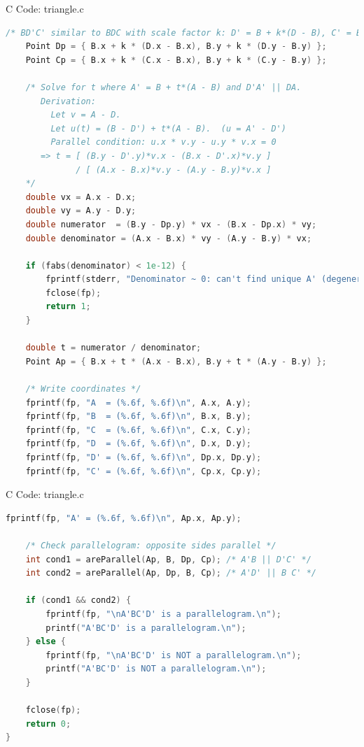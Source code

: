\documentclass{beamer}
\numberwithin{equation}{section}
\theoremstyle{remark}
\begin{document}
\begin{frame}[fragile]{C Code: triangle.c}
\begin{lstlisting}[language=C]
    /* BD'C' similar to BDC with scale factor k: D' = B + k*(D - B), C' = B + k*(C - B) */
    Point Dp = { B.x + k * (D.x - B.x), B.y + k * (D.y - B.y) };
    Point Cp = { B.x + k * (C.x - B.x), B.y + k * (C.y - B.y) };

    /* Solve for t where A' = B + t*(A - B) and D'A' || DA.
       Derivation:
         Let v = A - D.
         Let u(t) = (B - D') + t*(A - B).  (u = A' - D')
         Parallel condition: u.x * v.y - u.y * v.x = 0
       => t = [ (B.y - D'.y)*v.x - (B.x - D'.x)*v.y ]
              / [ (A.x - B.x)*v.y - (A.y - B.y)*v.x ]
    */
    double vx = A.x - D.x;
    double vy = A.y - D.y;
    double numerator  = (B.y - Dp.y) * vx - (B.x - Dp.x) * vy;
    double denominator = (A.x - B.x) * vy - (A.y - B.y) * vx;

    if (fabs(denominator) < 1e-12) {
        fprintf(stderr, "Denominator ~ 0: can't find unique A' (degenerate configuration)\n");
        fclose(fp);
        return 1;
    }

    double t = numerator / denominator;
    Point Ap = { B.x + t * (A.x - B.x), B.y + t * (A.y - B.y) };

    /* Write coordinates */
    fprintf(fp, "A  = (%.6f, %.6f)\n", A.x, A.y);
    fprintf(fp, "B  = (%.6f, %.6f)\n", B.x, B.y);
    fprintf(fp, "C  = (%.6f, %.6f)\n", C.x, C.y);
    fprintf(fp, "D  = (%.6f, %.6f)\n", D.x, D.y);
    fprintf(fp, "D' = (%.6f, %.6f)\n", Dp.x, Dp.y);
    fprintf(fp, "C' = (%.6f, %.6f)\n", Cp.x, Cp.y);
    \end{lstlisting}
\end{frame}

\begin{frame}[fragile]{C Code: triangle.c}
\begin{lstlisting}[language=C]
    fprintf(fp, "A' = (%.6f, %.6f)\n", Ap.x, Ap.y);

    /* Check parallelogram: opposite sides parallel */
    int cond1 = areParallel(Ap, B, Dp, Cp); /* A'B || D'C' */
    int cond2 = areParallel(Ap, Dp, B, Cp); /* A'D' || B C' */

    if (cond1 && cond2) {
        fprintf(fp, "\nA'BC'D' is a parallelogram.\n");
        printf("A'BC'D' is a parallelogram.\n");
    } else {
        fprintf(fp, "\nA'BC'D' is NOT a parallelogram.\n");
        printf("A'BC'D' is NOT a parallelogram.\n");
    }

    fclose(fp);
    return 0;
}
 \end{lstlisting}
\end{frame}
\end{document}
